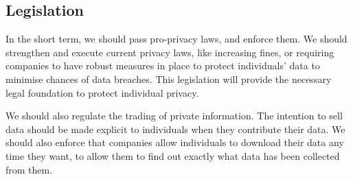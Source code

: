 \documentclass{icmmcm}
\begin{document}
\subsection{Legislation}
In the short term, we should pass pro-privacy laws, and enforce them. 
We should strengthen and execute current privacy laws, like increasing fines, or requiring companies to have robust measures in place to protect individuals' data to minimise chances of data breaches. This legislation will provide the necessary legal foundation to protect individual privacy.

We should also regulate the trading of private information. The intention to sell data should be made explicit to individuals when they contribute their data. We should also enforce that companies allow individuals to download their data any time they want, to allow them to find out exactly what data has been collected from them.





\end{document}
